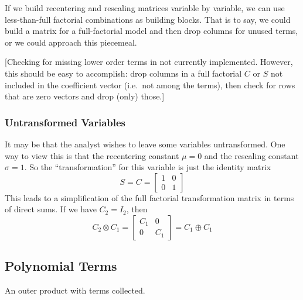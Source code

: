\documentclass[]{article}
\begin{document}
If we build recentering and rescaling matrices variable by variable, we
can use less-than-full factorial combinations as building blocks. That
is to say, we could build a matrix for a full-factorial model and then
drop columns for unused terms, or we could approach this piecemeal.

{[}Checking for missing lower order terms in not currently implemented.
However, this should be easy to accomplish: drop columns in a full
factorial \(C\) or \(S\) not included in the coefficient vector
(i.e.~not among the terms), then check for rows that are zero vectors
and drop (only) those.{]}

\hypertarget{untransformed-variables}{%
\subsubsection{Untransformed Variables}\label{untransformed-variables}}

It may be that the analyst wishes to leave some variables untransformed.
One way to view this is that the recentering constant \(\mu=0\) and the
rescaling constant \(\sigma=1\). So the ``transformation'' for this
variable is just the identity matrix
\[S=C=\begin{bmatrix}1 & 0 \\ 0 &1 \end{bmatrix}\] This leads to a
simplification of the full factorial transformation matrix in terms of
direct sums. If we have \(C_2=I_2\), then
\[C_2 \otimes C_1 = \begin{bmatrix}C_1 &0 \\ 0 &C_1\end{bmatrix} = C_1 \oplus C_1 \]

\hypertarget{polynomial-terms}{%
\subsection{Polynomial Terms}\label{polynomial-terms}}

An outer product with terms collected.
\end{document}
